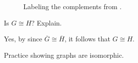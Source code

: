 \begin{exam}
\begin{apart}
\begin{soln}
                        \begin{figure}[hbtp]
                            \centering
                            
                            \caption{Labeling the complements from .}
                            \label{fig_ism_Ham6_comp_labeled}
                        \end{figure}
                \end{soln}
            \item Is $G \cong H$? Explain.
                \begin{soln}
                    Yes, by  since $\overline{G} \cong \overline{H}$, it follows that $G \cong H$.
                \end{soln}
        \end{apart}
\end{exam}

Practice showing graphs are isomorphic.

